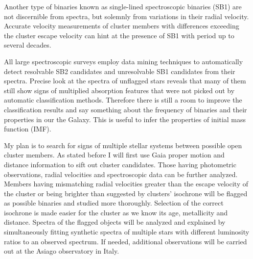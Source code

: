 Another type of binaries known as single-lined spectroscopic binaries (SB1) are not discernible from spectra, but solemnly from variations in their radial velocity. Accurate velocity measurements of cluster members with differences exceeding the cluster escape velocity can hint at the presence of SB1 with period up to several decades.

All large spectroscopic surveys employ data mining techniques to automatically detect resolvable SB2 candidates \cite{2010AJ....140..184M, 2017ApJS..228...24T} and unresolvable SB1 candidates \cite{2011AJ....141..200M} from their spectra. Precise look at the spectra of unflagged stars reveals that many of them still show signs of multiplied absorption features that were not picked out by automatic classification methods. Therefore there is still a room to improve the classification results and say something about the frequency of binaries and their properties in our the Galaxy. This is useful to infer the properties of initial mass function (IMF).

My plan is to search for signs of multiple stellar systems between possible open cluster members. As stated before I will first use Gaia proper motion and distance information to sift out cluster candidates. Those having photometric observations, radial velocities and spectroscopic data can be further analyzed. Members having mismatching radial velocities greater than the escape velocity of the cluster or being brighter than suggested by clusters' isochrone will be flagged as possible binaries and studied more thoroughly. Selection of the correct isochrone is made easier for the cluster as we know its age, metallicity and distance. Spectra  of the flagged objects will be analyzed and explained by simultaneously fitting \cite{2018MNRAS.473.5043E} synthetic spectra \cite{2005A&A...442.1127M} of multiple stars with different luminosity ratios to an observed spectrum. If needed, additional observations will be carried out at the Asiago observatory in Italy. %


